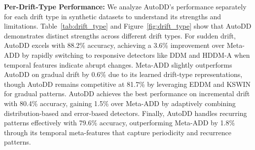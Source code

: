 \documentclass[11pt]{article}
\begin{document}

\textbf{Per-Drift-Type Performance:} We analyze AutoDD's performance separately for each drift type in synthetic datasets to understand its strengths and limitations. Table~\ref{tab:drift_type} and Figure~\ref{fig:drift_type} show that AutoDD demonstrates distinct strengths across different drift types. For sudden drift, AutoDD excels with 88.2\% accuracy, achieving a 3.6\% improvement over Meta-ADD by rapidly switching to responsive detectors like DDM and HDDM-A when temporal features indicate abrupt changes. Meta-ADD slightly outperforms AutoDD on gradual drift by 0.6\% due to its learned drift-type representations, though AutoDD remains competitive at 81.7\% by leveraging EDDM and KSWIN for gradual patterns. AutoDD achieves the best performance on incremental drift with 80.4\% accuracy, gaining 1.5\% over Meta-ADD by adaptively combining distribution-based and error-based detectors. Finally, AutoDD handles recurring patterns effectively with 79.6\% accuracy, outperforming Meta-ADD by 1.8\% through its temporal meta-features that capture periodicity and recurrence patterns.

\begin{table}[H]
\centering
\caption{Accuracy (\%) by drift type (GaussianNB).}
\label{tab:drift_type}
\end{table}
\end{document}
